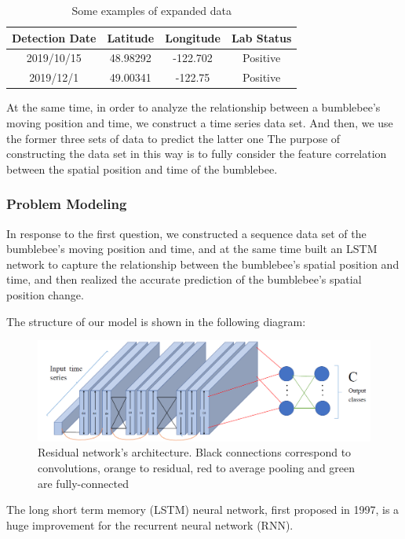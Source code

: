 \documentclass{mcmthesis}
\begin{document}
\begin{table}[H]   %
	\centering	\caption{Some examples of expanded data}
	\begin{tabular}{cccc}
		\toprule[1.5pt]
		Detection Date&Latitude&Longitude &	Lab Status \\
		\midrule[1pt]
2019/10/15&	48.98292&	-122.702	&Positive\\
2019/12/1 &	49.00341 & -122.75 &	Positive\\
		\bottomrule[1.5pt]
	\end{tabular}
\end{table}

At the same time, in order to analyze the relationship between a bumblebee's moving position and time, we construct a time series data set. 
And then, we use the former three sets of data to predict the latter one 
The purpose of constructing the data set in this way is to fully consider the feature correlation between the spatial position and time of the bumblebee.

\hspace*{\fill}
\subsubsection{Problem Modeling}
In response to the first question, we constructed a sequence data set of the bumblebee's moving position and time, and at the same time built an LSTM network to capture the relationship between the bumblebee's spatial position and time, and then realized the accurate prediction of the bumblebee's spatial position change. 

The structure of our model is shown in the following diagram:
\begin{figure}[H]
	\centering
	\includegraphics[width=\textwidth]{screenshot008}
	\caption{Residual network's architecture. Black connections correspond to convolutions, orange to residual, red to average pooling and green are fully-connected}
	\label{fig:screenshot008}
\end{figure}

The long short term memory (LSTM) neural network, first proposed in 1997, is a huge improvement for the recurrent neural network (RNN). 
\end{document}
